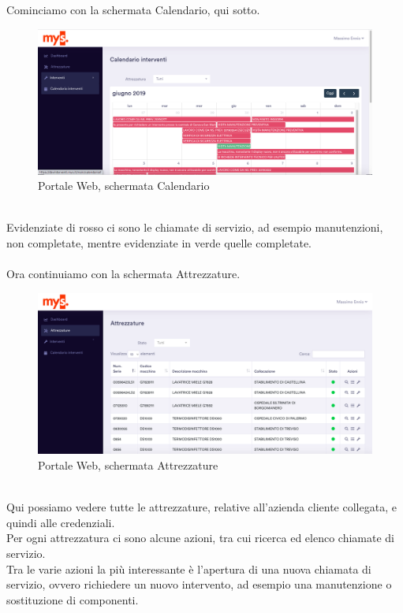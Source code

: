 \newpage
Cominciamo con la schermata Calendario, qui sotto.\\
\begin{figure}[!h] 
	\centering 
	\includegraphics[scale = 0.3]{immagini/portale/calendario.png} 
	\caption {Portale Web, schermata Calendario}
\end{figure}
\\Evidenziate di rosso ci sono le chiamate di servizio, ad esempio manutenzioni, non completate, mentre evidenziate in verde quelle completate.\\\\
Ora continuiamo con la schermata Attrezzature.\\
\begin{figure}[!h] 
	\centering 
	\includegraphics[scale = 0.25]{immagini/portale/attrezzature.png} 
	\caption {Portale Web, schermata Attrezzature}
\end{figure}
\\Qui possiamo vedere tutte le attrezzature, relative all'azienda cliente collegata, e quindi alle credenziali.\\
Per ogni attrezzatura ci sono alcune azioni, tra cui ricerca ed elenco chiamate di servizio.\\Tra le varie azioni la più interessante è l'apertura di una nuova chiamata di servizio, ovvero richiedere un nuovo intervento, ad esempio una manutenzione o sostituzione di componenti.\\\\
